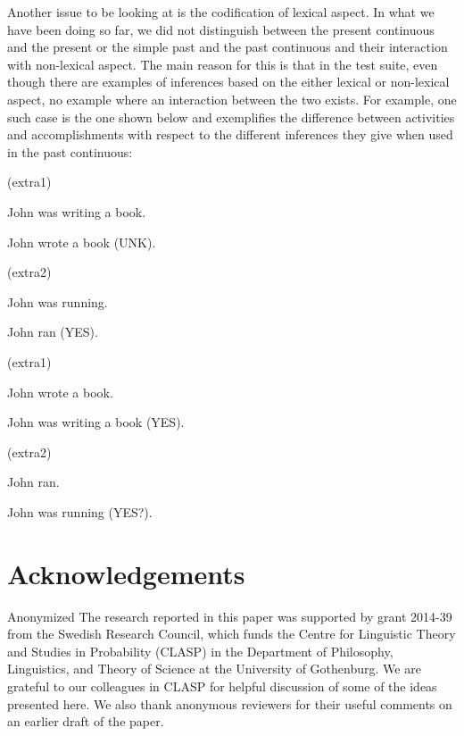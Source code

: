 \documentclass[a4paper,11pt]{article}
\newcommand\hyp{\item[H]}
\newcommand\fracasex[2]{\begin{lingex}\item[(#1)] \begin{subex} #2 \end{subex} \end{lingex} }
\begin{document}
Another issue to be looking at is the codification of lexical
aspect. In what we have been doing so far, we did not distinguish
between the present continuous and the present or the simple past and
the past continuous and their interaction with non-lexical aspect.
The main reason for this is that in the test suite, even though there
are examples of inferences based on the either lexical or non-lexical
aspect, no example where an interaction between the two exists. For
example, one such case is the one shown below and exemplifies the
difference between activities and accomplishments with respect to the
different inferences they give when used in the past continuous:

\fracasex{extra1}{
	\item	John was writing a book. 
	\hyp 	John wrote a book (UNK).
}

\fracasex{extra2}{
	\item	John was running. 
	\hyp 	John ran (YES).
}

\fracasex{extra1}{
	\item	John wrote a book. 
	\hyp 	John was writing a book (YES).
}

\fracasex{extra2}{
	\item	John ran.
	\hyp 	John was running (YES?).
}



\section*{Acknowledgements}

\ifanon
Anonymized
\else
The research reported in this paper was supported by grant 2014-39 from the
Swedish Research Council, which funds the Centre for Linguistic Theory and
Studies in Probability (CLASP) in the Department of Philosophy, Linguistics,
and Theory of Science at the University of Gothenburg. We are grateful to
our colleagues in CLASP for helpful discussion of some of the ideas presented
here. We also thank anonymous reviewers for their useful comments on an
earlier draft of the paper.
\fi


% 


\end{document}
